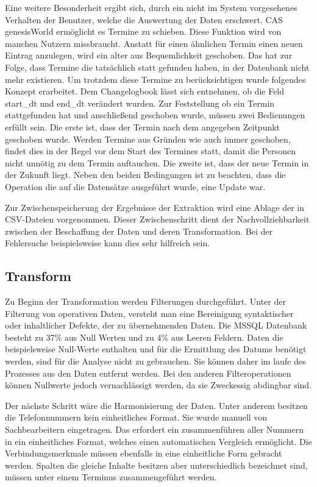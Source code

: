 Eine weitere Besonderheit ergibt sich, durch ein nicht im System vorgesehenes Verhalten der Benutzer, welche die Auswertung der Daten erschwert. CAS genesisWorld ermöglicht es Termine zu schieben. Diese Funktion wird von manchen Nutzern missbraucht. Anstatt für einen ähnlichen Termin einen neuen Eintrag anzulegen, wird ein alter aus Bequemlichkeit geschoben. Das hat zur Folge, dass Termine die tatsächlich statt gefunden haben, in der Datenbank nicht mehr existieren. Um trotzdem diese Termine zu berücksichtigen wurde folgendes Konzept erarbeitet. Dem Changelogbook lässt sich entnehmen, ob die Feld start\_dt und end\_dt verändert wurden. Zur Feststellung ob ein Termin stattgefunden hat und anschließend geschoben wurde, müssen zwei Bedienungen erfüllt sein. Die erste ist, dass der Termin nach dem angegeben Zeitpunkt geschoben wurde. Werden Termine aus Gründen wie auch immer geschoben, findet dies in der Regel vor dem Start des Termines statt, damit die Personen nicht unnötig zu dem Termin auftauchen. Die zweite ist, dass der neue Termin in der Zukunft liegt. Neben den beiden Bedingungen ist zu beachten, dass die Operation die auf die Datensätze ausgeführt wurde, eine Update war.

Zur Zwischenspeicherung der Ergebnisse der Extraktion wird eine Ablage der in CSV-Dateien vorgenommen. Dieser Zwischenschritt dient der Nachvollziehbarkeit zwischen der Beschaffung der Daten und deren Transformation. Bei der Fehlersuche beispielsweise kann dies sehr hilfreich sein.  

\subsection{Transform}

Zu Beginn der Transformation werden Filterungen durchgeführt. Unter der Filterung von operativen Daten, versteht man eine Bereinigung syntaktischer oder inhaltlicher Defekte, der zu übernehmenden Daten. Die MSSQL Datenbank besteht zu 37\% aus Null Werten und zu 4\% aus Leeren Feldern. Daten die beispielsweise Null-Werte enthalten und für die Ermittlung des Datums benötigt werden, sind für die Analyse nicht zu gebrauchen. Sie können daher im laufe des Prozesses aus den Daten entfernt werden. Bei den anderen Filteroperationen können Nullwerte jedoch vernachlässigt werden, da sie Zweckessig abdingbar sind.

Der nächste Schritt wäre die Harmonisierung der Daten. Unter anderem besitzen die Telefonnummern kein einheitliches Format. Sie wurde manuell von Sachbearbeitern eingetragen. Das erfordert ein zusammenführen aller Nummern in ein einheitliches Format, welches einen automatischen Vergleich ermöglicht. Die Verbindungsmerkmale müssen ebenfalls in eine einheitliche Form gebracht werden. Spalten die gleiche Inhalte besitzen aber unterschiedlich bezeichnet sind, müssen unter einem Terminus zusammengeführt werden. 

